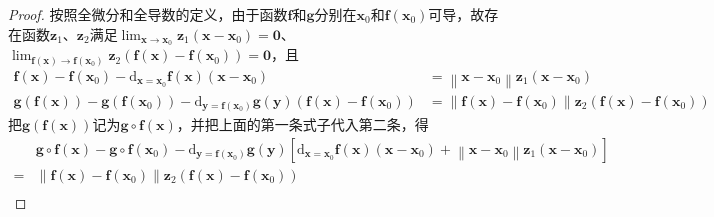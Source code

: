 \documentclass[main.tex]{subfiles}
\begin{document}
\begin{proof}
    按照全微分和全导数的定义，由于函数$\mathbf{f}$和$\mathbf{g}$分别在$\mathbf{x}_0$和$\mathbf{f}\left(\mathbf{x}_0\right)$可导，故存在函数$\mathbf{z}_1$、$\mathbf{z}_2$满足$\lim_{\mathbf{x}\to\mathbf{x}_0}\mathbf{z}_1\left(\mathbf{x}-\mathbf{x}_0\right)=\mathbf{0}$、$\lim_{\mathbf{f}\left(\mathbf{x}\right)\to\mathbf{f}\left(\mathbf{x}_0\right)}\mathbf{z}_2\left(\mathbf{f}\left(\mathbf{x}\right)-\mathbf{f}\left(\mathbf{x}_0\right)\right)=\mathbf{0}$，且
    \begin{align*}
        \mathbf{f}\left(\mathbf{x}\right)-\mathbf{f}\left(\mathbf{x}_0\right)-\mathrm{d}_{\mathbf{x}=\mathbf{x}_0}\mathbf{f}\left(\mathbf{x}\right)\left(\mathbf{x}-\mathbf{x}_0\right)                                                                                                                    & =\left\|\mathbf{x}-\mathbf{x}_0\right\|\mathbf{z}_1\left(\mathbf{x}-\mathbf{x}_0\right)                                                                                             \\
        \mathbf{g}\left(\mathbf{f}\left(\mathbf{x}\right)\right)-\mathbf{g}\left(\mathbf{f}\left(\mathbf{x}_0\right)\right)-\mathrm{d}_{\mathbf{y}=\mathbf{f}\left(\mathbf{x}_0\right)}\mathbf{g}\left(\mathbf{y}\right)\left(\mathbf{f}\left(\mathbf{x}\right)-\mathbf{f}\left(\mathbf{x}_0\right)\right) & =\left\|\mathbf{f}\left(\mathbf{x}\right)-\mathbf{f}\left(\mathbf{x}_0\right)\right\|\mathbf{z}_2\left(\mathbf{f}\left(\mathbf{x}\right)-\mathbf{f}\left(\mathbf{x}_0\right)\right)
    \end{align*}
    把$\mathbf{g}\left(\mathbf{f}\left(\mathbf{x}\right)\right)$记为$\mathbf{g}\circ\mathbf{f}\left(\mathbf{x}\right)$，并把上面的第一条式子代入第二条，得
    \begin{align*}
                        & \mathbf{g}\circ\mathbf{f}\left(\mathbf{x}\right)-\mathbf{g}\circ\mathbf{f}\left(\mathbf{x}_0\right)-\mathrm{d}_{\mathbf{y}=\mathbf{f}\left(\mathbf{x}_0\right)}\mathbf{g}\left(\mathbf{y}\right)\left[\mathrm{d}_{\mathbf{x}=\mathbf{x}_0}\mathbf{f}\left(\mathbf{x}\right)\left(\mathbf{x}-\mathbf{x}_0\right)+\left\|\mathbf{x}-\mathbf{x}_0\right\|\mathbf{z}_1\left(\mathbf{x}-\mathbf{x}_0\right)\right] \\
        =               & \left\|\mathbf{f}\left(\mathbf{x}\right)-\mathbf{f}\left(\mathbf{x}_0\right)\right\|\mathbf{z}_2\left(\mathbf{f}\left(\mathbf{x}\right)-\mathbf{f}\left(\mathbf{x}_0\right)\right)                                                                                                                                                                                                                            \\

\end{align*}
\end{proof}
\end{document}

